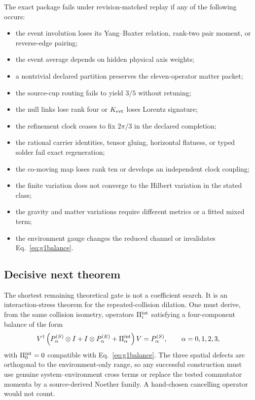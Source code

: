 \documentclass[11pt]{article}
\theoremstyle{definition}
\theoremstyle{remark}
\begin{document}
The exact package fails under revision-matched replay if any of the following occurs:
\begin{itemize}
\item the event involution loses its Yang--Baxter relation, rank-two pair moment, or reverse-edge pairing;
\item the event average depends on hidden physical axis weights;
\item a nontrivial declared partition preserves the eleven-operator matter packet;
\item the source-cup routing fails to yield $3/5$ without retuning;
\item the null links lose rank four or $K_{\rm evt}$ loses Lorentz signature;
\item the refinement clock ceases to fix $2\pi/3$ in the declared completion;
\item the rational carrier identities, tensor gluing, horizontal flatness, or typed solder fail exact regeneration;
\item the co-moving map loses rank ten or develops an independent clock coupling;
\item the finite variation does not converge to the Hilbert variation in the stated class;
\item the gravity and matter variations require different metrics or a fitted mixed term;
\item the environment gauge changes the reduced channel or invalidates Eq.~\eqref{eq:g1balance}.
\end{itemize}

\subsection{Decisive next theorem}

The shortest remaining theoretical gate is not a coefficient search. It is an interaction-stress theorem for the repeated-collision dilation. One must derive, from the same collision isometry, operators $\Pi_i^{\rm int}$ satisfying a four-component balance of the form
\begin{equation}\label{eq:discretewardtarget}
 V^{\dagger}\left(
 P_{\alpha}^{(S)}\otimes I
 +I\otimes P_{\alpha}^{(E)}
 +\Pi_{\alpha}^{\rm int}
 \right)V=P_{\alpha}^{(S)},
 \qquad \alpha=0,1,2,3,
\end{equation}
with $\Pi_0^{\rm int}=0$ compatible with Eq.~\eqref{eq:g1balance}. The three spatial defects are orthogonal to the environment-only range, so any successful construction must use genuine system--environment cross terms or replace the tested commutator momenta by a source-derived Noether family. A hand-chosen cancelling operator would not count.
\end{document}
